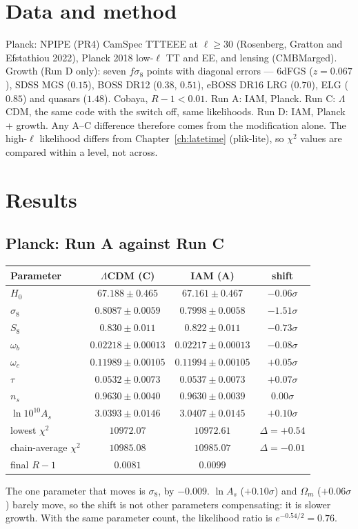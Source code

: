 \section{Data and method}
Planck: NPIPE (PR4) CamSpec TTTEEE at $\ell\ge30$ (Rosenberg, Gratton and Efstathiou 2022), Planck 2018 low-$\ell$ TT and EE, and lensing (CMBMarged).
Growth (Run D only): seven $f\sigma_8$ points with diagonal errors --- 6dFGS ($z=0.067$), SDSS MGS ($0.15$), BOSS DR12 ($0.38$, $0.51$), eBOSS DR16 LRG
($0.70$), ELG ($0.85$) and quasars ($1.48$). Cobaya, $R-1<0.01$. Run A: IAM, Planck. Run C: $\Lambda$CDM, the same code with the switch off, same
likelihoods. Run D: IAM, Planck + growth. Any A--C difference therefore comes from the modification alone. The high-$\ell$ likelihood differs from
Chapter~\ref{ch:latetime} (plik-lite), so $\chi^2$ values are compared within a level, not across.

\section{Results}
\subsection{Planck: Run A against Run C}
\begin{center}\small
\begin{tabular}{lccc}\hline
Parameter & $\Lambda$CDM (C) & IAM (A) & shift\\\hline
$H_0$ & $67.188\pm0.465$ & $67.161\pm0.467$ & $-0.06\sigma$\\
$\sigma_8$ & $0.8087\pm0.0059$ & $0.7998\pm0.0058$ & $-1.51\sigma$\\
$S_8$ & $0.830\pm0.011$ & $0.822\pm0.011$ & $-0.73\sigma$\\
$\omega_b$ & $0.02218\pm0.00013$ & $0.02217\pm0.00013$ & $-0.08\sigma$\\
$\omega_c$ & $0.11989\pm0.00105$ & $0.11994\pm0.00105$ & $+0.05\sigma$\\
$\tau$ & $0.0532\pm0.0073$ & $0.0537\pm0.0073$ & $+0.07\sigma$\\
$n_s$ & $0.9630\pm0.0040$ & $0.9630\pm0.0039$ & $0.00\sigma$\\
$\ln10^{10}A_s$ & $3.0393\pm0.0146$ & $3.0407\pm0.0145$ & $+0.10\sigma$\\
lowest $\chi^2$ & $10972.07$ & $10972.61$ & $\Delta=+0.54$\\
chain-average $\chi^2$ & $10985.08$ & $10985.07$ & $\Delta=-0.01$\\
final $R-1$ & $0.0081$ & $0.0099$ & \\\hline
\end{tabular}
\end{center}
The one parameter that moves is $\sigma_8$, by $-0.009$. $\ln A_s$ ($+0.10\sigma$) and $\Omega_m$ ($+0.06\sigma$) barely move, so the shift is not other parameters
compensating: it is slower growth. With the same parameter count, the likelihood ratio is $e^{-0.54/2}=0.76$.

